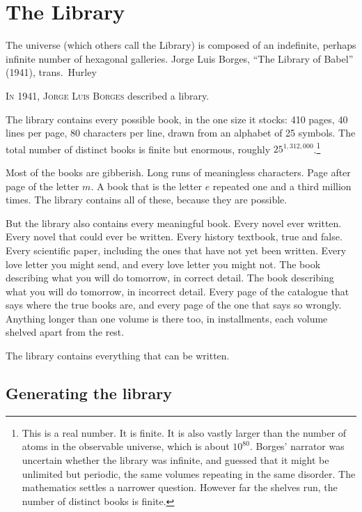 \chapter{The Library}

\chapterepigraph
{The universe (which others call the Library) is composed of an indefinite, perhaps infinite number of hexagonal galleries.}
{Jorge Luis Borges, ``The Library of Babel'' (1941), trans.\ Hurley}

\noindent \textsc{In 1941, Jorge Luis Borges} described a library.

The library contains every possible book, in the one size it stocks: 410 pages, 40 lines per page, 80 characters per line, drawn from an alphabet of 25 symbols. The total number of distinct books is finite but enormous, roughly $25^{1{,}312{,}000}$.\footnote{This is a real number. It is finite. It is also vastly larger than the number of atoms in the observable universe, which is about $10^{80}$. Borges' narrator was uncertain whether the library was infinite, and guessed that it might be unlimited but periodic, the same volumes repeating in the same disorder. The mathematics settles a narrower question. However far the shelves run, the number of distinct books is finite.}

Most of the books are gibberish. Long runs of meaningless characters. Page after page of the letter $m$. A book that is the letter $e$ repeated one and a third million times. The library contains all of these, because they are possible.

But the library also contains every meaningful book. Every novel ever written. Every novel that could ever be written. Every history textbook, true and false. Every scientific paper, including the ones that have not yet been written. Every love letter you might send, and every love letter you might not. The book describing what you will do tomorrow, in correct detail. The book describing what you will do tomorrow, in incorrect detail. Every page of the catalogue that says where the true books are, and every page of the one that says so wrongly. Anything longer than one volume is there too, in installments, each volume shelved apart from the rest.

The library contains everything that can be written.

\section*{Generating the library}

